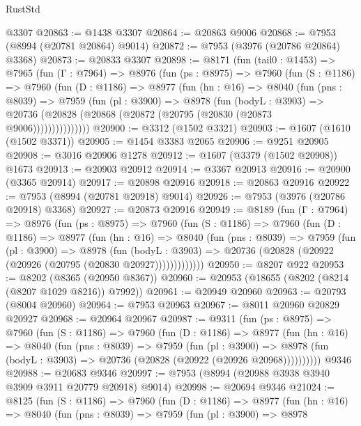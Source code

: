 \begin{lexlean}{RustStd}
\begin{coremodule}
    @3307
@20863 := @1438 @3307
@20864 := @20863 @9006
@20868 := @7953 (@8994 (@20781 @20864) @9014)
@20872 := @7953 (@3976 (@20786 @20864) @3368)
@20873 := @20833 @3307
@20898 := @8171
    (fun (tail0 : @1453) =>
    @7965
      (fun (Γ : @7964) =>
      @8976
        (fun (ps : @8975) =>
        @7960
          (fun (S : @1186) =>
          @7960
            (fun (D : @1186) =>
            @8977
              (fun (hn : @16) =>
              @8040
                (fun (pns : @8039) =>
                @7959
                  (fun (pl : @3900) =>
                  @8978
                    (fun (bodyL : @3903) =>
                    @20736 (@20828 (@20868 (@20872 (@20795 (@20830 (@20873 @9006)))))))))))))))
@20900 := @3312 (@1502 @3321)
@20903 := @1607 (@1610 (@1502 @3371))
@20905 := @1454 @3383 @2065
@20906 := @9251 @20905
@20908 := @3016 @20906 @1278
@20912 := @1607 (@3379 (@1502 @20908)) @1673
@20913 := @20903 @20912
@20914 := @3367 @20913
@20916 := @20900 (@3365 @20914)
@20917 := @20898 @20916
@20918 := @20863 @20916
@20922 := @7953 (@8994 (@20781 @20918) @9014)
@20926 := @7953 (@3976 (@20786 @20918) @3368)
@20927 := @20873 @20916
@20949 := @8189
    (fun (Γ : @7964) =>
    @8976
      (fun (ps : @8975) =>
      @7960
        (fun (S : @1186) =>
        @7960
          (fun (D : @1186) =>
          @8977
            (fun (hn : @16) =>
            @8040
              (fun (pns : @8039) =>
              @7959
                (fun (pl : @3900) =>
                @8978
                  (fun (bodyL : @3903) =>
                  @20736 (@20828 (@20922 (@20926 (@20795 (@20830 @20927)))))))))))))
@20950 := @8207 @922
@20953 := @8202 (@8365 (@20950 @8367))
@20960 := @20953 (@18655 (@8202 (@8214 (@8207 @1029 @8216)) @7992))
@20961 := @20949 @20960
@20963 := @20793 (@8004 @20960)
@20964 := @7953 @20963
@20967 := @8011 @20960 @20829 @20927
@20968 := @20964 @20967
@20987 := @9311
    (fun (ps : @8975) =>
    @7960
      (fun (S : @1186) =>
      @7960
        (fun (D : @1186) =>
        @8977
          (fun (hn : @16) =>
          @8040
            (fun (pns : @8039) =>
            @7959
              (fun (pl : @3900) =>
              @8978 (fun (bodyL : @3903) => @20736 (@20828 (@20922 (@20926 @20968))))))))))
    @9346
@20988 := @20683 @9346
@20997 := @7953 (@8994 (@20988 @3938 @3940 @3909 @3911 @20779 @20918) @9014)
@20998 := @20694 @9346
@21024 := @8125
    (fun (S : @1186) =>
    @7960
      (fun (D : @1186) =>
      @8977
        (fun (hn : @16) =>
        @8040
          (fun (pns : @8039) =>
          @7959
            (fun (pl : @3900) =>
            @8978

\end{coremodule}
\end{lexlean}
